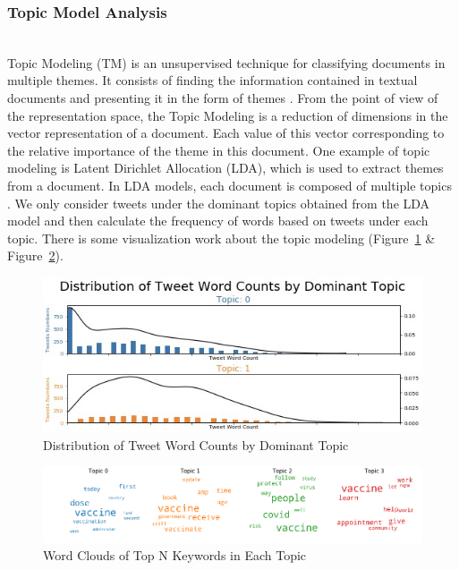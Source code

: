 \documentclass[sigplan,screen]{acmart}
\begin{document}
\subsubsection{Topic Model Analysis}
~\\
Topic Modeling (TM) is an unsupervised technique for classifying documents in multiple themes. It consists of finding the information contained in textual documents and presenting it in the form of themes {\cite{topicmodeling}}. From the point of view of the representation space, the Topic Modeling is a reduction of dimensions in the vector representation of a document. Each value of this vector corresponding to the relative importance of the theme in this document. One example of topic modeling is Latent Dirichlet Allocation (LDA), which is used to extract themes from a document. In LDA models, each document is composed of multiple topics {\cite{LDA}}. We only consider tweets under the dominant topics obtained from the LDA model and then calculate the frequency of words based on tweets under each topic. There is some visualization work about the topic modeling (Figure~\ref{fig:2} \& Figure~\ref{fig:3}).
\begin{figure}[h]
  \centering
  \includegraphics[width=0.65\linewidth]{resource/xinran/Word_Count_By_Topics.jpeg}
  \caption{Distribution of Tweet Word Counts by Dominant Topic}
  \label{fig:2}
\end{figure}

\begin{figure}[h]
  \centering
  \includegraphics[width=\linewidth]{resource/xinran/TopKeywords_Topic.png}
  \caption{Word Clouds of Top N Keywords in Each Topic}
  \label{fig:3}
\end{figure}
\end{document}

